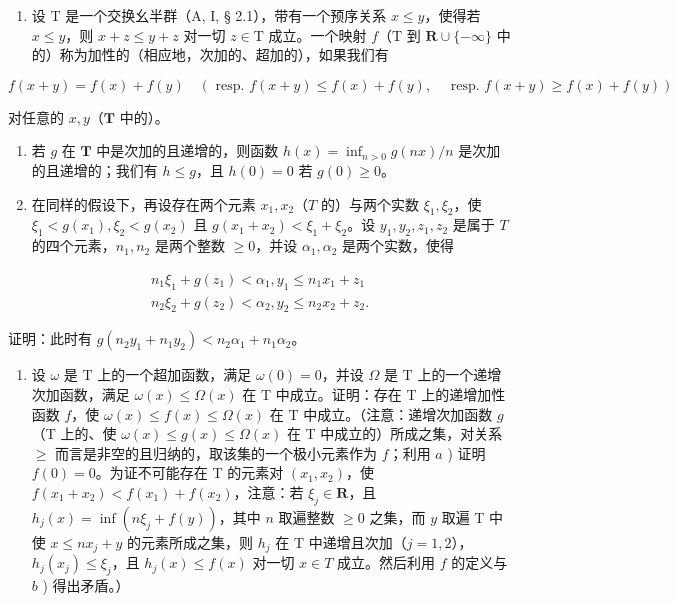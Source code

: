 \begin{enumerate}
\def\labelenumi{\arabic{enumi})}
\setcounter{enumi}{6}
\tightlist
\item
  设 \(\mathrm{T}\) 是一个交换幺半群（A, I, § 2.1），带有一个预序关系 \(x \leqslant y\)，使得若 \(x \leqslant y\)，则 \(x + z \leqslant y + z\) 对一切 \(z \in \mathrm{T}\) 成立。一个映射 \(f\)（\(\mathrm{T}\) 到 \(\mathbf{R} \cup \{-\infty\}\) 中的）称为加性的（相应地，次加的、超加的），如果我们有
\end{enumerate}

\[
f (x + y) = f (x) + f (y) \quad (\text { resp. } f (x + y) \leqslant f (x) + f (y), \quad \text { resp. } f (x + y) \geqslant f (x) + f (y))
\]

对任意的 \(x, y\)（\(\mathbf{T}\) 中的）。

\begin{enumerate}
\def\labelenumi{\alph{enumi})}
\item
  若 \(g\) 在 \(\mathbf{T}\) 中是次加的且递增的，则函数 \(h(x) = \inf_{n > 0} g(nx) / n\) 是次加的且递增的；我们有 \(h \leqslant g\)，且 \(h(0) = 0\) 若 \(g(0) \geqslant 0\)。
\item
  在同样的假设下，再设存在两个元素 \(x_{1}, x_{2}\)（\(T\) 的）与两个实数 \(\xi_{1}, \xi_{2}\)，使 \(\xi_{1} < g(x_{1}), \xi_{2} < g(x_{2})\) 且 \(g(x_{1} + x_{2}) < \xi_{1} + \xi_{2}\)。设 \(y_{1}, y_{2}, z_{1}, z_{2}\) 是属于 \(T\) 的四个元素，\(n_{1}, n_{2}\) 是两个整数 \(\geqslant 0\)，并设 \(\alpha_{1}, \alpha_{2}\) 是两个实数，使得
\end{enumerate}

\[
\begin{array}{l} n _ {1} \xi_ {1} + g (z _ {1}) <   \alpha_ {1}, y _ {1} \leqslant n _ {1} x _ {1} + z _ {1} \\ n _ {2} \xi_ {2} + g (z _ {2}) <   \alpha_ {2}, y _ {2} \leqslant n _ {2} x _ {2} + z _ {2}. \end{array}
\]

证明：此时有 \(g(n_2y_1 + n_1y_2) < n_2\alpha_1 + n_1\alpha_2\)。

\begin{enumerate}
\def\labelenumi{\alph{enumi})}
\setcounter{enumi}{2}
\tightlist
\item
  设 \(\omega\) 是 T 上的一个超加函数，满足 \(\omega(0) = 0\)，并设 \(\Omega\) 是 T 上的一个递增次加函数，满足 \(\omega(x) \leqslant \Omega(x)\) 在 T 中成立。证明：存在 T 上的递增加性函数 \(f\)，使 \(\omega(x) \leqslant f(x) \leqslant \Omega(x)\) 在 T 中成立。（注意：递增次加函数 \(g\)（T 上的、使 \(\omega(x) \leqslant g(x) \leqslant \Omega(x)\) 在 T 中成立的）所成之集，对关系 \(\geqslant\) 而言是非空的且归纳的，取该集的一个极小元素作为 \(f\)；利用 \(a\) ) 证明 \(f(0) = 0\)。为证不可能存在 T 的元素对 \((x_1, x_2)\)，使 \(f(x_1 + x_2) < f(x_1) + f(x_2)\)，注意：若 \(\xi_j \in \mathbf{R}\)，且 \(h_j(x) = \inf(n\xi_j + f(y))\)，其中 \(n\) 取遍整数 \(\geqslant 0\) 之集，而 \(y\) 取遍 T 中使 \(x \leqslant nx_j + y\) 的元素所成之集，则 \(h_j\) 在 T 中递增且次加（\(j = 1, 2\)），\(h_j(x_j) \leqslant \xi_j\)，且 \(h_j(x) \leqslant f(x)\) 对一切 \(x \in T\) 成立。然后利用 \(f\) 的定义与 \(b\) ) 得出矛盾。）
\end{enumerate}

